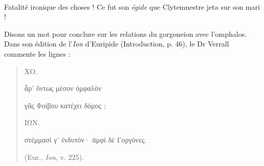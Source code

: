 \documentclass[a4paper, 11pt, oneside, polutonikogreek, french]{article}
\begin{document}
\paragraph{}
Fatalité ironique des choses ! Ce fut son \emph{égide} que Clytemnestre jeta sur son mari !

Disons un mot pour conclure sur les relations du gorgoneion avec l'omphalos. Dans son édition de l'\emph{Ion} d'Euripide (Introduction, p. 46), le Dr Verrall commente les lignes :
\begin{quotation}\normalsize
ΧΟ.

ἆρ' ὄντως μέσον ὀμφαλὸν

γᾶς Φοίβου κατέχει δόμος ;

\bigskip

ΙΩΝ.

στέμμασί γ' ἐνδυτόν· ἀμφὶ δὲ Γοργόνες.

(Eur., \emph{Ion}, v. 225).
\end{quotation}
\end{document}
